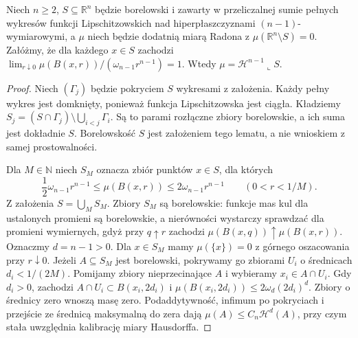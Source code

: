 \begin{lemat}
\label{lem:dg-density-identification}
Niech $n\ge2$, $S\subseteq\mathbb R^n$ będzie
borelowski i zawarty w przeliczalnej sumie pełnych
wykresów funkcji Lipschitzowskich nad hiperpłaszczyznami
$(n-1)$-wymiarowymi, a $\mu$ niech będzie dodatnią
miarą Radona z $\mu(\mathbb R^n\setminus S)=0$.
Załóżmy, że dla każdego $x\in S$ zachodzi
$\lim_{r\downarrow0}\mu(B(x,r))/
(\omega_{n-1}r^{n-1})=1$.
Wtedy $\mu=\mathcal H^{n-1}\llcorner S$.
\end{lemat}
\begin{proof}
Niech $(\Gamma_j)$ będzie pokryciem $S$ wykresami
z założenia. Każdy pełny wykres jest domknięty,
ponieważ funkcja Lipschitzowska jest ciągła.
Kładziemy $S_j=(S\cap\Gamma_j)\setminus
\bigcup_{i<j}\Gamma_i$. Są to parami rozłączne
zbiory borelowskie, a ich suma jest dokładnie $S$.
Borelowskość $S$ jest założeniem tego lematu,
a nie wnioskiem z samej prostowalności.

Dla $M\in\mathbb N$ niech $S_M$ oznacza
zbiór punktów $x\in S$, dla których
\[
 \frac12\omega_{n-1}r^{n-1}
 \le\mu(B(x,r))\le2\omega_{n-1}r^{n-1}
 \qquad(0<r<1/M).
\]
Z założenia $S=\bigcup_MS_M$.
Zbiory $S_M$ są borelowskie: funkcje mas kul
dla ustalonych promieni są borelowskie,
a nierówności wystarczy sprawdzać dla promieni
wymiernych, gdyż przy $q\uparrow r$ zachodzi
$\mu(B(x,q))\uparrow\mu(B(x,r))$.
Oznaczmy $d=n-1>0$. Dla $x\in S_M$ mamy
$\mu(\{x\})=0$ z górnego oszacowania przy $r\downarrow0$.
Jeżeli $A\subseteq S_M$ jest borelowski, pokrywamy
go zbiorami $U_i$ o średnicach $d_i<1/(2M)$.
Pomijamy zbiory nieprzecinające $A$ i wybieramy
$x_i\in A\cap U_i$. Gdy $d_i>0$, zachodzi
$A\cap U_i\subset B(x_i,2d_i)$ i
$\mu(B(x_i,2d_i))\le2\omega_d(2d_i)^d$.
Zbiory o średnicy zero wnoszą masę zero.
Podaddytywność, infimum po pokryciach i przejście
ze średnicą maksymalną do zera dają
$\mu(A)\le C_n\mathcal H^d(A)$, przy czym stała
uwzględnia kalibrację miary Hausdorffa.


\end{proof}
